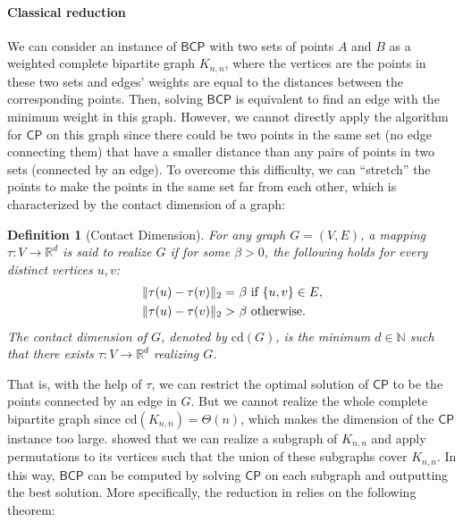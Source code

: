 \documentclass[10pt,a4paper]{article}
\newtheorem{definition}[theorem]{Definition}
\newcommand{\N}{\mathbb{N}}
\newcommand{\R}{\mathbb{R}}
\newcommand{\CP}{\ensuremath{\mathsf{CP}}}
\newcommand{\BCP}{\ensuremath{\mathsf{BCP}}}
\begin{document}
\paragraph{Classical reduction} 
We can consider an instance of $\BCP$ with two sets of points $A$ and $B$ as a weighted complete bipartite graph $K_{n,n}$, where the vertices are the points in these two sets and edges' weights are equal to the distances between the corresponding points. Then, solving $\BCP$ is equivalent to find an edge with the minimum weight in this graph.  
However, we cannot directly apply the algorithm for $\CP$ on this graph since there could be two points in the same set (no edge connecting them) that have a smaller distance than any pairs of points in two sets (connected by an edge). To overcome this difficulty, we can ``stretch'' the points to make the points in the same set far from each other, which is characterized by the contact dimension of a graph:
\begin{definition}[Contact Dimension]\label{def:contact_dim}
For any graph $G=(V,E)$, a mapping $\tau:V\rightarrow \R^d$ is said to realize $G$ if for some $\beta>0$, the following holds for every distinct vertices $u,v$:
\begin{align}
    \|\tau(u)-\tau(v)\|_2  =&~\beta ~ \text{if~} \{u,v\}\in E,\\
    \|\tau(u)-\tau(v)\|_2  > &~\beta ~ \text{otherwise.}\notag
\end{align}
The contact dimension of $G$, denoted by $\mathrm{cd}(G)$, is the minimum $d\in \N$ such that there exists $\tau:V\rightarrow \R^d$ realizing $G$.
\end{definition}
That is, with the help of $\tau$, we can restrict the optimal solution of $\CP$ to be the points connected by an edge in $G$. But we cannot realize the whole complete bipartite graph since $\mathrm{cd}(K_{n,n})=\Theta(n)$, which makes the dimension of the $\CP$ instance too large. \cite{r29} showed that we can realize a subgraph of $K_{n,n}$ and apply permutations to its vertices such that the union of these subgraphs cover $K_{n,n}$. In this way, $\BCP$ can be computed by solving $\CP$ on each subgraph and outputting the best solution. More specifically, the reduction in \cite{r29} relies on the following theorem:
\end{document}
